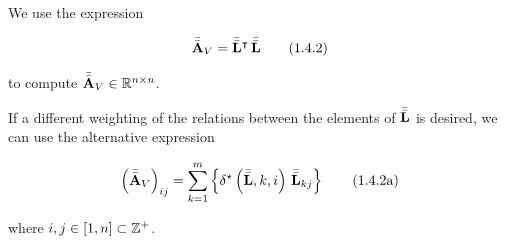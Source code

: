 \documentclass[../ClusteringConnectionsMAIN.tex]{subfiles}
\begin{document}
\begin{flushleft}
\begin{large}

We use the expression

\begin{align}
\bar{\bar{\mathbf{A}}}_V = \bar{\bar{\mathbf{L}}}^\intercal \, \bar{\bar{\mathbf{L}}} \tag{1.4.2}
\end{align}

to compute $\bar{\bar{\mathbf{A}}}_V \in \mathbb{R}^{n \times n}$. \newline

If a different weighting of the relations between the elements of $\bar{\bar{\mathbf{L}}}$ is desired, we can use the alternative expression

\begin{align}
\left( \bar{\bar{\mathbf{A}}}_V \right)_{ij} = \sum_{k = 1}^m \left\{ \delta^\star \left( \bar{\bar{\mathbf{L}}}, k, i \right) \, \bar{\bar{\mathbf{L}}}_{kj} \right\} \tag{1.4.2a}
\end{align}

where $i, j \in \left[ 1, n \right] \subset \mathbb{Z}^+$.







































\end{large}
\end{flushleft}
\end{document}
